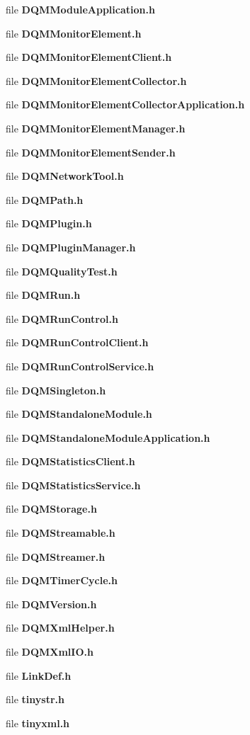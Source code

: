 \begin{DoxyCompactItemize}
file {\bf D\+Q\+M\+Module\+Application.\+h}
\item 
file {\bf D\+Q\+M\+Monitor\+Element.\+h}
\item 
file {\bf D\+Q\+M\+Monitor\+Element\+Client.\+h}
\item 
file {\bf D\+Q\+M\+Monitor\+Element\+Collector.\+h}
\item 
file {\bf D\+Q\+M\+Monitor\+Element\+Collector\+Application.\+h}
\item 
file {\bf D\+Q\+M\+Monitor\+Element\+Manager.\+h}
\item 
file {\bf D\+Q\+M\+Monitor\+Element\+Sender.\+h}
\item 
file {\bf D\+Q\+M\+Network\+Tool.\+h}
\item 
file {\bf D\+Q\+M\+Path.\+h}
\item 
file {\bf D\+Q\+M\+Plugin.\+h}
\item 
file {\bf D\+Q\+M\+Plugin\+Manager.\+h}
\item 
file {\bf D\+Q\+M\+Quality\+Test.\+h}
\item 
file {\bf D\+Q\+M\+Run.\+h}
\item 
file {\bf D\+Q\+M\+Run\+Control.\+h}
\item 
file {\bf D\+Q\+M\+Run\+Control\+Client.\+h}
\item 
file {\bf D\+Q\+M\+Run\+Control\+Service.\+h}
\item 
file {\bf D\+Q\+M\+Singleton.\+h}
\item 
file {\bf D\+Q\+M\+Standalone\+Module.\+h}
\item 
file {\bf D\+Q\+M\+Standalone\+Module\+Application.\+h}
\item 
file {\bf D\+Q\+M\+Statistics\+Client.\+h}
\item 
file {\bf D\+Q\+M\+Statistics\+Service.\+h}
\item 
file {\bf D\+Q\+M\+Storage.\+h}
\item 
file {\bf D\+Q\+M\+Streamable.\+h}
\item 
file {\bf D\+Q\+M\+Streamer.\+h}
\item 
file {\bf D\+Q\+M\+Timer\+Cycle.\+h}
\item 
file {\bf D\+Q\+M\+Version.\+h}
\item 
file {\bf D\+Q\+M\+Xml\+Helper.\+h}
\item 
file {\bf D\+Q\+M\+Xml\+I\+O.\+h}
\item 
file {\bf Link\+Def.\+h}
\item 
file {\bf tinystr.\+h}
\item 
file {\bf tinyxml.\+h}
\end{DoxyCompactItemize}
